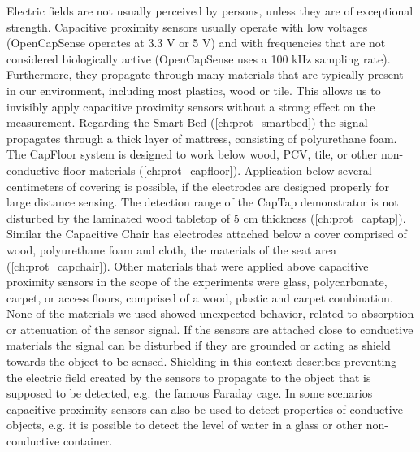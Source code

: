 Electric fields are not usually perceived by persons, unless they are of exceptional strength. Capacitive proximity sensors usually operate with low voltages (OpenCapSense operates at 3.3 V or 5 V) and with frequencies that are not considered biologically active (OpenCapSense uses a 100 kHz sampling rate). Furthermore, they propagate through many materials that are typically present in our environment, including most plastics, wood or tile. This allows us to invisibly apply capacitive proximity sensors without a strong effect on the measurement. Regarding the Smart Bed (\ref{ch:prot_smartbed}) the signal propagates through a thick layer of mattress, consisting of polyurethane foam. The CapFloor system is designed to work below wood, PCV, tile, or other non-conductive floor materials (\ref{ch:prot_capfloor}). Application below several centimeters of covering is possible, if the electrodes are designed properly for large distance sensing. The detection range of the CapTap demonstrator is not disturbed by the laminated wood tabletop of 5 cm thickness (\ref{ch:prot_captap}). Similar the Capacitive Chair has electrodes attached below a cover comprised of wood, polyurethane foam and cloth, the materials of the seat area (\ref{ch:prot_capchair}). Other materials that were applied above capacitive proximity sensors in the scope of the experiments were glass, polycarbonate, carpet, or access floors, comprised of a wood, plastic and carpet combination. None of the materials we used showed unexpected behavior, related to absorption or attenuation of the sensor signal. If the sensors are attached close to conductive materials the signal can be disturbed if they are grounded or acting as shield towards the object to be sensed. Shielding in this context describes preventing the electric field created by the sensors to propagate to the object that is supposed to be detected, e.g. the famous Faraday cage. In some scenarios capacitive proximity sensors can also be used to detect properties of conductive objects, e.g. it is possible to detect the level of water in a glass or other non-conductive container.


